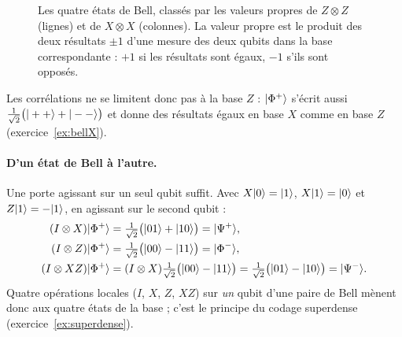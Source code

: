 \begin{figure}[!ht]
\centering
{}
\caption{Les quatre états de Bell, classés par les valeurs propres de $Z\otimes Z$ (lignes) et de
$X\otimes X$ (colonnes). La valeur propre est le produit des deux résultats $\pm1$ d'une mesure des
deux qubits dans la base correspondante : $+1$ si les résultats sont égaux, $-1$ s'ils sont opposés.}
\label{fig:grille-bell}
\end{figure}

Les corrélations ne se limitent donc pas à la base $Z$ : $|\Phi^+\rangle$ s'écrit aussi
$\frac{1}{\sqrt2}\big(|++\rangle+|--\rangle\big)$ et donne des résultats égaux en base $X$ comme en base $Z$
(exercice~\ref{ex:bellX}).

\paragraph{D'un état de Bell à l'autre.} Une porte agissant sur un seul qubit suffit. Avec
$X|0\rangle=|1\rangle$, $X|1\rangle=|0\rangle$ et $Z|1\rangle=-|1\rangle$, en agissant sur le second qubit :
\begin{align*}
  (I\otimes X)|\Phi^+\rangle&=\tfrac{1}{\sqrt2}\big(|01\rangle+|10\rangle\big)=|\Psi^+\rangle,\\
  (I\otimes Z)|\Phi^+\rangle&=\tfrac{1}{\sqrt2}\big(|00\rangle-|11\rangle\big)=|\Phi^-\rangle,\\
  (I\otimes XZ)|\Phi^+\rangle&=(I\otimes X)\tfrac{1}{\sqrt2}\big(|00\rangle-|11\rangle\big)
    =\tfrac{1}{\sqrt2}\big(|01\rangle-|10\rangle\big)=|\Psi^-\rangle.
\end{align*}
Quatre opérations locales ($I$, $X$, $Z$, $XZ$) sur \emph{un} qubit d'une paire de Bell mènent donc
aux quatre états de la base ; c'est le principe du codage superdense
(exercice~\ref{ex:superdense}).

